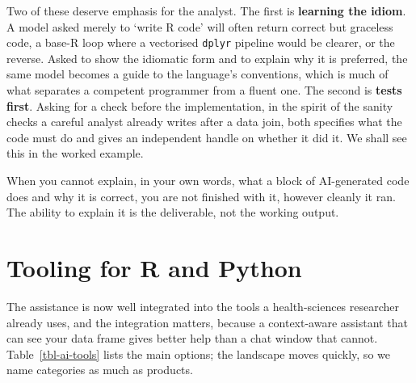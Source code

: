 \documentclass[
  letterpaper,
  11pt]{scrbook}
\begin{document}
Two of these deserve emphasis for the analyst. The first is
\textbf{learning the idiom}. A model asked merely to `write R code' will
often return correct but graceless code, a base-R loop where a
vectorised \texttt{dplyr} pipeline would be clearer, or the reverse.
Asked to show the idiomatic form and to explain why it is preferred, the
same model becomes a guide to the language's conventions, which is much
of what separates a competent programmer from a fluent one. The second
is \textbf{tests first}. Asking for a check before the implementation,
in the spirit of the sanity checks a careful analyst already writes
after a data join, both specifies what the code must do and gives an
independent handle on whether it did it. We shall see this in the worked
example.

\begin{tcolorbox}[enhanced jigsaw, arc=.35mm, bottomrule=.15mm, bottomtitle=1mm, breakable, colback=white, colbacktitle=quarto-callout-tip-color!10!white, colframe=quarto-callout-tip-color-frame, coltitle=black, left=2mm, leftrule=.75mm, opacityback=0, opacitybacktitle=0.6, rightrule=.15mm, title=\textcolor{quarto-callout-tip-color}{\faLightbulb}\hspace{0.5em}{Tip}, titlerule=0mm, toprule=.15mm, toptitle=1mm]

When you cannot explain, in your own words, what a block of AI-generated
code does and why it is correct, you are not finished with it, however
cleanly it ran. The ability to explain it is the deliverable, not the
working output.

\end{tcolorbox}

\section{Tooling for R and Python}\label{tooling-for-r-and-python}

The assistance is now well integrated into the tools a health-sciences
researcher already uses, and the integration matters, because a
context-aware assistant that can see your data frame gives better help
than a chat window that cannot. Table~\ref{tbl-ai-tools} lists the main
options; the landscape moves quickly, so we name categories as much as
products.
\end{document}
